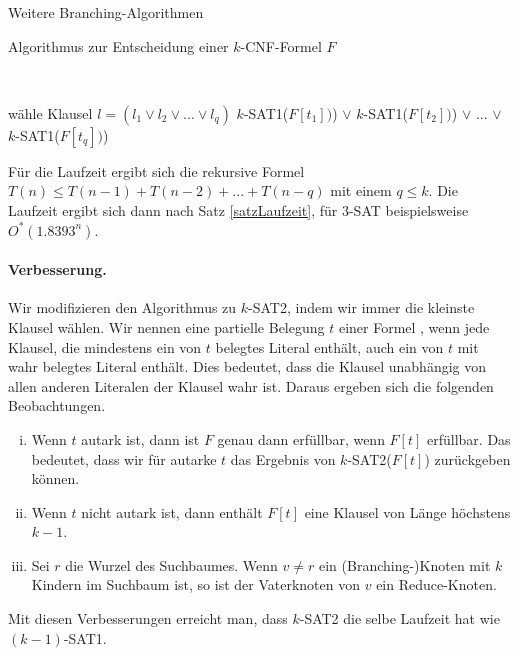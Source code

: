 \begin{section}{Weitere Branching-Algorithmen}
  \begin{algorithm}[H]
    \caption{Algorithmus zur Entscheidung einer \(k\)-CNF-Formel \(F\)}

     \\


    wähle Klausel \(l = (l_1 \vee l_2 \vee ... \vee l_q)\) \;
    \Return \(k\)-SAT1(\(F[t_1])\)) \(\vee\) \(k\)-SAT1(\(F[t_2])\)) \(\vee\) ... \(\vee\) \(k\)-SAT1(\(F[t_q])\))\;
  \end{algorithm}

  Für die Laufzeit ergibt sich die rekursive Formel \(T(n) \leq T(n-1) + T(n-2) + ... + T(n-q)\) mit einem \(q \leq k\). Die Laufzeit ergibt sich dann nach Satz \ref{satzLaufzeit}, für \(3\)-SAT beispielsweise \(O^*(1.8393^n)\).

  \paragraph{Verbesserung.} Wir modifizieren den Algorithmus zu \(k\)-SAT2, indem wir immer die kleinste Klausel wählen. Wir nennen eine partielle Belegung \(t\) einer Formel , wenn jede Klausel, die mindestens ein von \(t\) belegtes Literal enthält, auch ein von \(t\) mit wahr belegtes Literal enthält. Dies bedeutet, dass die Klausel unabhängig von allen anderen Literalen der Klausel wahr ist. Daraus ergeben sich die folgenden Beobachtungen.
  \begin{enumerate}[(i)]
   \item Wenn \(t\) autark ist, dann ist \(F\) genau dann erfüllbar, wenn \(F[t]\) erfüllbar. Das bedeutet, dass wir für autarke \(t\) das Ergebnis von \(k\)-SAT2(\(F[t]\)) zurückgeben können.
   \item Wenn \(t\) nicht autark ist, dann enthält \(F[t]\) eine Klausel von Länge höchstens \(k-1\).
   \item Sei \(r\) die Wurzel des Suchbaumes. Wenn \(v \neq r\) ein (Branching-)Knoten mit \(k\) Kindern im Suchbaum ist, so ist der Vaterknoten von \(v\) ein Reduce-Knoten.
  \end{enumerate}
  Mit diesen Verbesserungen erreicht man, dass \(k\)-SAT2 die selbe Laufzeit hat wie \((k-1)\)-SAT1.
  
\end{section}
  
